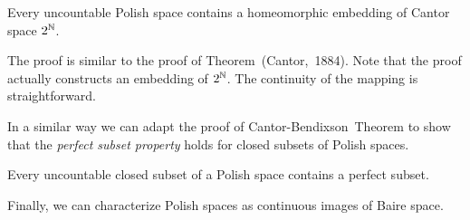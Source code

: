 \begin{theorem}\label{thm-cantor-embedding}Every uncountable Polish space contains a homeomorphic embedding of Cantor space $2^{\mathbb{N}}$.

\end{theorem}The proof is similar to the proof of Theorem~(Cantor,~1884). Note that the proof actually constructs an embedding of $2^{\mathbb{N}}$. The continuity of the mapping is straightforward.

In a similar way we can adapt the proof of Cantor-Bendixson~Theorem to show that the \textit{perfect subset property} holds for closed subsets of Polish spaces.

\begin{theorem}\label{thm-cantor_bendixson-polish}Every uncountable closed subset of a Polish space contains a perfect subset.

\end{theorem}Finally, we can characterize Polish spaces as continuous images of Baire space.

